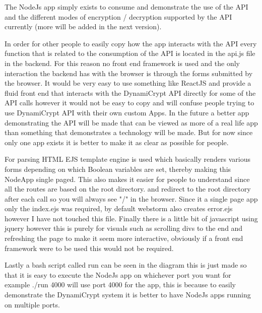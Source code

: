 The NodeJs app simply exists to consume and demonstrate the use of the API and the different modes of encryption / decryption supported by the API currently (more will be added in the next version). 

In order for other people to easily copy how the app interacts with the API every function that is related to the consumption of the API is located in the api.js file in the backend. For this reason no front end framework is used and the only interaction the backend has with the browser is through the forms submitted by the browser. It would be very easy to use something like ReactJS and provide a fluid front end that interacts with the DynamiCrypt API directly for some of the API calls however it would not be easy to copy and will confuse people trying to use DynamiCrypt API with their own custom Apps. In the future a better app demonstrating the API will be made that can be viewed as more of a real life app than something that demonstrates a technology will be made. But for now since only one app exists it is better to make it as clear as possible for people.

For parsing HTML EJS template engine is used which basically renders various forms depending on which Boolean variables are set, thereby making this NodeApp single paged. This also makes it easier for people to understand since all the routes are based on the root directory. and redirect to the root directory after each call so you will always see "/" in the browser. Since it a single page app only the index.ejs was required, by default webstorm also creates error.ejs however I have not touched this file. Finally there is a little bit of javascript using jquery however this is purely for visuals such as scrolling divs to the end and refreshing the page to make it seem more interactive, obviously if a front end framework were to be used this would not be required.

Lastly a bash script called run can be seen in the diagram this is just made so that it is easy to execute the NodeJs app on whichever port you want for example ./run 4000 will use port 4000 for the app, this is because to easily demonstrate the DynamiCrypt system it is better to have NodeJs apps running on multiple ports.
